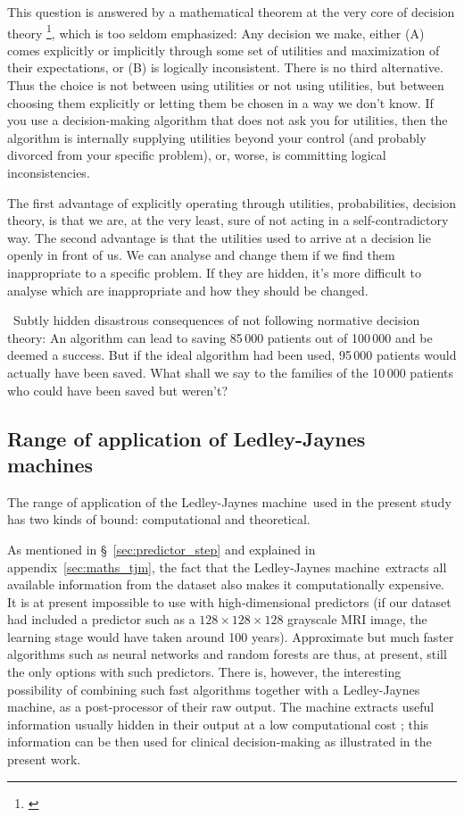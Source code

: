 \documentclass[utf8]{FrontiersinHarvard} %
\newcommand*{\pencil}{{\fontencoding{U}\fontfamily{fontawesometwo}\selectfont\symbol{210}}}
\newcommand{\mynotep}[1]{{\color{notecolour}\pencil\ #1}}
\newcommand*{\sect}{\S}%
\renewcommand*{\|}[1][]{\nonscript\:#1\vert\nonscript\:\mathopen{}}
\newcommand*{\ljm}{Ledley-Jaynes machine}
\begin{document}
This question is answered by a mathematical theorem at the very core of decision theory \footnote{\citet{savage1954_r1972,luceetal1957,raiffaetal1961_r2000,atkinsonetal1964,ferguson1967,lindley1971_r1988,kreps1988,bernardoetal1994_r2000,prattetal1995_r1996,lindley2006_r2014,pettigrew2011_r2019}}, which is too seldom emphasized: Any decision we make, either (A) comes explicitly or implicitly through some set of utilities and maximization of their expectations, or (B) is logically inconsistent. There is no third alternative. Thus the choice is not between using utilities or not using utilities, but between choosing them explicitly or letting them be chosen in a way we don't know. If you use a decision-making algorithm that does not ask you for utilities, then the algorithm is internally supplying utilities beyond your control (and probably divorced from your specific problem), or, worse, is committing logical inconsistencies.

The first advantage of explicitly operating through utilities, probabilities, decision theory, is that we are, at the very least, sure of not acting in a self-contradictory way. The second advantage is that the utilities used to arrive at a decision lie openly in front of us. We can analyse and change them if we find them inappropriate to a specific problem. If they are hidden, it's more difficult to analyse which are inappropriate and how they should be changed.

\mynotep{Subtly hidden disastrous consequences of not following normative decision theory: An algorithm can lead to saving 85\,000 patients out of 100\,000 and be deemed a success. But if the ideal algorithm had been used, 95\,000 patients would actually have been saved. What shall we say to the families of the 10\,000 patients who could have been saved but weren't?}

\subsection{Range of application of \ljm s}
\label{sec:rangeLJM}

The range of application of the \ljm\ used in the present study has two kinds of bound: computational and theoretical.

As mentioned in \sect~\ref{sec:predictor_step} and explained in appendix~\ref{sec:maths_tjm}, the fact that the \ljm\ extracts all available information from the dataset also makes it computationally expensive. It is at present impossible to use with high-dimensional predictors (if our dataset had included a predictor such as a $128\times128\times128$ grayscale MRI image, the learning stage would have taken around 100 years). Approximate but much faster algorithms such as neural networks and random forests are thus, at present, still the only options with such predictors. There is, however, the interesting possibility of combining such fast algorithms together with a \ljm, as a post-processor of their raw output. The machine extracts useful information usually hidden in their output at a low computational cost \citep{dyrlandetal2022b}; this information can be then used for clinical decision-making as illustrated in the present work.
\end{document}
